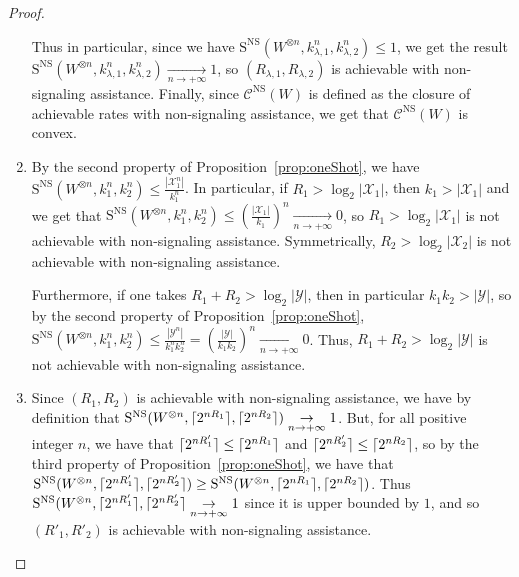\begin{proof}
\begin{enumerate}
    Thus in particular, since we have $\mathrm{S}^{\mathrm{NS}}(W^{\otimes n},k^n_{\lambda,1},k^n_{\lambda,2}) \leq 1$, we get the result $\mathrm{S}^{\mathrm{NS}}(W^{\otimes n},k^n_{\lambda,1},k^n_{\lambda,2}) \underset{n \rightarrow +\infty}{\rightarrow} 1$, so $(R_{\lambda,1},R_{\lambda,2})$ is achievable with non-signaling assistance. Finally, since $\mathcal{C}^{\mathrm{NS}}(W)$ is defined as the closure of achievable rates with non-signaling assistance, we get that $\mathcal{C}^{\mathrm{NS}}(W)$ is convex.
    
  \item By the second property of Proposition~\ref{prop:oneShot}, we have$\mathrm{S}^{\mathrm{NS}}(W^{\otimes n},k_1^n,k_2^n) \leq \frac{|\mathcal{X}_1^n|}{k_1^n}$. In particular, if $R_1 > \log_2 |\mathcal{X}_1|$, then $k_1 > |\mathcal{X}_1|$ and we get that $\mathrm{S}^{\mathrm{NS}}(W^{\otimes n},k_1^n,k_2^n) \leq \left(\frac{|\mathcal{X}_1|}{k_1}\right)^n \underset{n \rightarrow +\infty}{\rightarrow} 0$, so $R_1 > \log_2 |\mathcal{X}_1|$ is not achievable with non-signaling assistance. Symmetrically, $R_2 > \log_2 |\mathcal{X}_2|$ is not achievable with non-signaling assistance.

    Furthermore, if one takes $R_1+R_2 > \log_2|\mathcal{Y}|$, then in particular $k_1k_2 > |\mathcal{Y}|$, so by the second property of Proposition~\ref{prop:oneShot}, $\mathrm{S}^{\mathrm{NS}}(W^{\otimes n},k_1^n,k_2^n) \leq \frac{|\mathcal{Y}^n|}{k_1^nk_2^n} = \left(\frac{|\mathcal{Y}|}{k_1k_2}\right)^n \underset{n \rightarrow +\infty}{\rightarrow} 0$. Thus, $R_1+R_2 > \log_2|\mathcal{Y}|$ is not achievable with non-signaling assistance.
    
  \item Since $(R_1,R_2)$ is achievable with non-signaling assistance, we have by definition that $\mathrm{S}^{\mathrm{NS}}(W^{\otimes n},\lceil2^{nR_1}\rceil,\lceil2^{nR_2}\rceil) \underset{n \rightarrow +\infty}{\rightarrow} 1$. But, for all positive integer $n$, we have that $\lceil2^{nR'_1}\rceil \leq \lceil2^{nR_1}\rceil$ and $\lceil2^{nR'_2}\rceil\leq \lceil2^{nR_2}\rceil$, so by the third property of Proposition~\ref{prop:oneShot}, we have that $\mathrm{S}^{\mathrm{NS}}(W^{\otimes n},\lceil2^{nR'_1}\rceil,\lceil2^{nR'_2}\rceil) \geq \mathrm{S}^{\mathrm{NS}}(W^{\otimes n},\lceil2^{nR_1}\rceil,\lceil2^{nR_2}\rceil)$. Thus $\mathrm{S}^{\mathrm{NS}}(W^{\otimes n},\lceil2^{nR'_1}\rceil,\lceil2^{nR'_2}\rceil \underset{n \rightarrow +\infty}{\rightarrow} 1$ since it is upper bounded by $1$, and so $(R'_1,R'_2)$ is achievable with non-signaling assistance.
  \end{enumerate}
\end{proof}


